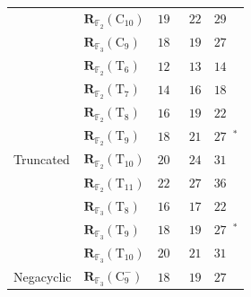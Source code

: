 \documentclass[11pt]{article}
\theoremstyle{definition}
\newcommand{\F}{\mathbb{F}}
\newcommand{\Rk}[2]{\mathbf{R}_{#1}(#2)}
\newcommand{\Cyct}[1]{\mathrm{C}_{#1}}
\newcommand{\Trunct}[1]{\mathrm{T}_{#1}}
\newcommand{\Negat}[1]{\mathrm{C}^{-}_{#1}}
\begin{document}
\begin{table}[!ht]
\begin{tabular}{lllll}
    & $\Rk{\F_2}{\Cyct{10}}$     & $19$~\cite{averbuch1988classification,blaser2005complete}                     & $22$   & $29$~\cite{morgera1990multiplicative}                        \\
    & $\Rk{\F_3}{\Cyct{9}}$      & $18$~\cite{averbuch1991classification,blaser2005complete}                     & $19$   & $27$~\cite{morgera1990multiplicative,cenk2011multiplication} \\
    \midrule
    \multirow{9}{*}{Truncated}
    & $\Rk{\F_2}{\Trunct{6}}$    & $12$~\cite{averbuch1991classification,blaser2005complete}                     & $13$   & $14$~\cite{cenk2011multiplication}                           \\
    & $\Rk{\F_2}{\Trunct{7}}$    & $14$~\cite{averbuch1991classification,blaser2005complete}                     & $16$   & $18$~\cite{cenk2011multiplication}                           \\
    & $\Rk{\F_2}{\Trunct{8}}$    & $16$~\cite{averbuch1991classification,blaser2005complete}                     & $19$   & $22$~\cite{cenk2011multiplication}                           \\
    & $\Rk{\F_2}{\Trunct{9}}$    & $18$~\cite{averbuch1991classification,blaser2005complete}                     & $21$   & $27$~\cite{cenk2011multiplication}$^\ast$                    \\
    & $\Rk{\F_2}{\Trunct{10}}$   & $20$~\cite{averbuch1991classification,blaser2005complete}                     & $24$   & $31$~\cite{cenk2011multiplication}                           \\
    & $\Rk{\F_2}{\Trunct{11}}$   & $22$~\cite{averbuch1991classification,blaser2005complete}                     & $27$   & $36$~\cite{cenk2011multiplication}                           \\
    & $\Rk{\F_3}{\Trunct{8}}$    & $16$~\cite{averbuch1991classification,blaser2005complete}                     & $17$   & $22$~\cite{cenk2011multiplication}                           \\
    & $\Rk{\F_3}{\Trunct{9}}$    & $18$~\cite{averbuch1991classification,blaser2005complete}                     & $19$   & $27$~\cite{winograd1977some}$^\ast$                          \\
    & $\Rk{\F_3}{\Trunct{10}}$   & $20$~\cite{averbuch1991classification,blaser2005complete}                     & $21$   & $31$~\cite{winograd1977some}                                 \\
    \midrule
    Negacyclic
    & $\Rk{\F_3}{\Negat{9}}$     & $18$~\cite{averbuch1991classification,blaser2005complete}                     & $19$   & $27$~\cite{cenk2011multiplication}                           \\
    \bottomrule
  \end{tabular}


\end{table}
\end{document}
